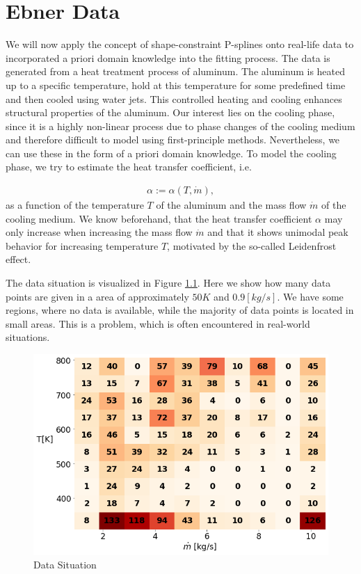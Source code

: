 \chapter{Ebner Data} \label{cha:real-world-application}

We will now apply the concept of shape-constraint P-splines onto real-life data to incorporated a priori domain knowledge into the fitting process. The data is generated from a heat treatment process of aluminum. The aluminum is heated up to a specific temperature, hold at this temperature for some predefined time and then cooled using water jets. This controlled heating and cooling enhances structural properties of the aluminum. Our interest lies on the cooling phase, since it is a highly non-linear process due to phase changes of the cooling medium and therefore difficult to model using first-principle methods. Nevertheless, we can use these in the form of a priori domain knowledge. To model the cooling phase, we try to estimate the heat transfer coefficient, i.e.

\begin{align}
	\alpha := \alpha(T, \dot m),
\end{align}
%
as a function of the temperature $T$ of the aluminum and the mass flow $\dot m$ of the cooling medium. We know beforehand, that the heat transfer coefficient $\alpha$ may only increase when increasing the mass flow $\dot m$ and that it shows unimodal peak behavior for increasing temperature $T$, motivated by the so-called Leidenfrost effect. 

The data situation is visualized in Figure \ref{fig:ebner_data_situation}. Here we show how many data points are given in a area of approximately $50 K$ and $0.9 [kg/s]$. We have some regions, where no data is available, while the majority of data points is located in small areas. This is a problem, which is often encountered in real-world situations. 

\begin{figure}[H]
	\centering
	\includegraphics[width=\columnwidth]{graphics/pgfplots/cha5/data_distribution.png}
	\caption{Data Situation}
	\label{fig:ebner_data_situation}
\end{figure}

